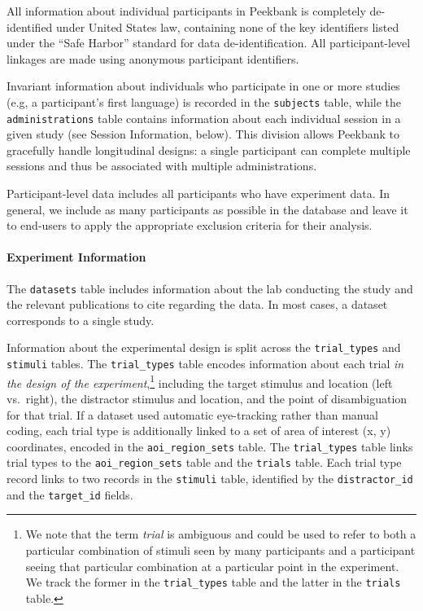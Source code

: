 \documentclass[
  english,
  man,floatsintext]{apa6}
\let\oldparagraph\paragraph
\renewcommand{\paragraph}[1]{\oldparagraph{#1}\mbox{}}
\begin{document}
All information about individual participants in Peekbank is completely de-identified under United States law, containing none of the key identifiers listed under the ``Safe Harbor'' standard for data de-identification.
All participant-level linkages are made using anonymous participant identifiers.

Invariant information about individuals who participate in one or more studies (e.g, a participant's first language) is recorded in the \texttt{subjects} table, while the \texttt{administrations} table contains information about each individual session in a given study (see Session Information, below).
This division allows Peekbank to gracefully handle longitudinal designs: a single participant can complete multiple sessions and thus be associated with multiple administrations.

Participant-level data includes all participants who have experiment data.
In general, we include as many participants as possible in the database and leave it to end-users to apply the appropriate exclusion criteria for their analysis.

\hypertarget{experiment-information}{%
\paragraph{Experiment Information}\label{experiment-information}}

The \texttt{datasets} table includes information about the lab conducting the study and the relevant publications to cite regarding the data.
In most cases, a dataset corresponds to a single study.

Information about the experimental design is split across the \texttt{trial\_types} and \texttt{stimuli} tables.
The \texttt{trial\_types} table encodes information about each trial \textit{in the design of the experiment},\footnote{We note that the term \textit{trial} is ambiguous and could be used to refer to both a particular combination of stimuli seen by many participants and a participant seeing that particular combination at a particular point in the experiment. We track the former in the \texttt{trial\_types} table and the latter in the \texttt{trials} table.} including the target stimulus and location (left vs.~right), the distractor stimulus and location, and the point of disambiguation for that trial.
If a dataset used automatic eye-tracking rather than manual coding, each trial type is additionally linked to a set of area of interest (x, y) coordinates, encoded in the \texttt{aoi\_region\_sets} table.
The \texttt{trial\_types} table links trial types to the \texttt{aoi\_region\_sets} table and the \texttt{trials} table.
Each trial type record links to two records in the \texttt{stimuli} table, identified by the \texttt{distractor\_id} and the \texttt{target\_id} fields.
\end{document}
